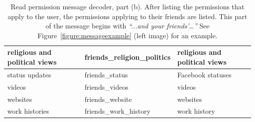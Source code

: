 \documentclass[10pt]{sig-alternate-10pt}
\begin{document}
\begin{subtables}
\begin{table}[htbp]
\begin{tabular}{|l|l|l|}
          religious and political views          & friends\_religion\_politics    & religious and political views                                                          \\ \hline
          status updates                         & friends\_status                & Facebook statuses                                                                      \\ \hline
          videos                                 & friends\_videos                & videos                                                                                 \\ \hline
          websites                               & friends\_website               & websites                                                                               \\ \hline
          work histories                         & friends\_work\_history         & work history                                                                           \\ \hline
  \end{tabular}
  \caption{\label{second} Read permission message decoder, part (b). After listing the permissions that apply to the user, the permissions applying to their friends are listed. This part of the message begins with \textit{``...and your friends'…''} See Figure~\ref{figure:messageexample} (left image) for an example.}
  \label{table:messagesr2}
\end{table}
\end{subtables}
\end{document}
